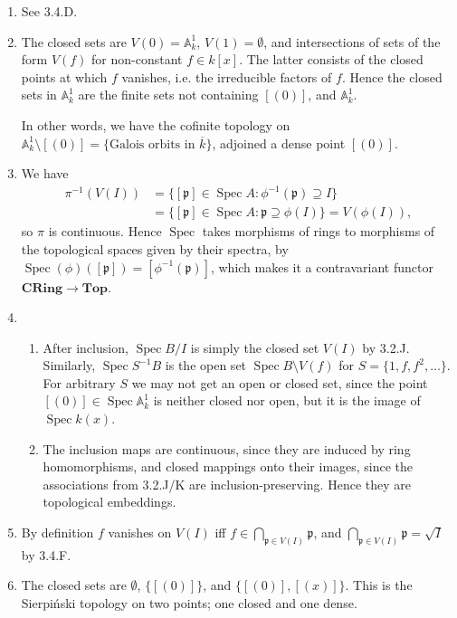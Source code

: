\documentclass{report}
\newcommand{\cat}[1]{\mathbf{#1}} %
\newcommand{\rad}[1]{\sqrt{#1}} %
\newcommand{\closure}[1]{\overline{#1}} %
\newcommand{\p}{\mathfrak{p}}
\newcommand{\A}{\mathbb{A}}
\DeclareMathOperator{\Spec}{Spec}
\begin{document}
\begin{enumerate}[label=\textbf{3.4.\Alph*.}]
	\item See 3.4.D.

	\item The closed sets are $V(0)=\A^1_k$, $V(1)=\emptyset$, and intersections
	      of sets of the form $V(f)$ for non-constant $f\in k[x]$. The latter
	      consists of the closed points at which $f$ vanishes, i.e. the
	      irreducible factors of $f$. Hence the closed sets in $\A^1_k$ are the
	      finite sets not containing $[(0)]$, and $\A^1_k$.

	      In other words, we have the cofinite topology on
	      $\A^1_k\setminus[(0)]=\{\text{Galois orbits in $\closure k$}\}$,
	      adjoined a dense point $[(0)]$.

	\item We have
	      \begin{align*}
		      \pi^{-1}(V(I))
		       & = \{[\p]\in\Spec A:\phi^{-1}(\p)\supseteq I\} \\
		       & = \{[\p]\in\Spec A:\p\supseteq\phi(I)\}
		      = V(\phi(I)),
	      \end{align*}
	      so $\pi$ is continuous. Hence $\Spec$ takes morphisms of rings to
	      morphisms of the topological spaces given by their spectra, by
	      $\Spec(\phi)([\p])=[\phi^{-1}(\p)]$, which makes it a contravariant
	      functor $\cat{CRing}\to\cat{Top}$.

	\item
	      \begin{enumerate}[label=(\alph*)]
		      \item After inclusion, $\Spec B/I$ is simply the closed set $V(I)$
		            by 3.2.J. Similarly, $\Spec S^{-1}B$ is the open set
		            $\Spec B\setminus V(f)$ for $S=\{1,f,f^2,\ldots\}$. For
		            arbitrary $S$ we may not get an open or closed set, since the
		            point $[(0)]\in\Spec\A^1_k$ is neither closed nor open, but
		            it is the image of $\Spec k(x)$.

		      \item The inclusion maps are continuous, since they are induced by
		            ring homomorphisms, and closed mappings onto their images,
		            since the associations from 3.2.J/K are inclusion-preserving.
		            Hence they are topological embeddings.
	      \end{enumerate}

	\item By definition $f$ vanishes on $V(I)$ iff $f\in\bigcap_{\p\in V(I)}\p$,
	      and $\bigcap_{\p\in V(I)}\p=\rad I$ by 3.4.F.

	\item The closed sets are $\emptyset$, $\bigl\{[(0)]\bigr\}$, and
	      $\bigl\{[(0)],[(x)]\bigr\}$. This is the Sierpi\'nski topology on two
	      points; one closed and one dense.
\end{enumerate}
\end{document}
